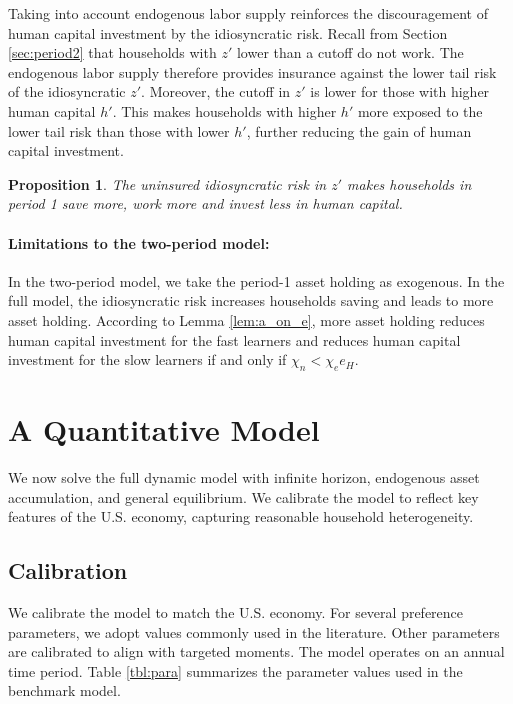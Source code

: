 \documentclass[12pt]{article}
\newtheorem{proposition}{Proposition}
\begin{document}
Taking into account endogenous labor supply reinforces the discouragement of human capital investment by the idiosyncratic risk. Recall from Section \ref{sec:period2} that households with $z'$ lower than a cutoff do not work. The endogenous labor supply therefore provides insurance against the lower tail risk of the idiosyncratic $z'$. Moreover, the cutoff in $z'$ is lower for those with higher human capital $h'$. This makes households with higher $h'$ more exposed to the lower tail risk than those with lower $h'$, further reducing the gain of human capital investment.


\begin{proposition}
    The uninsured idiosyncratic risk in $z'$ makes households in period 1 save more, work more and invest less in human capital.
\end{proposition}

\paragraph{Limitations to the two-period model:} In the two-period model, we take the period-1 asset holding as exogenous. In the full model, the idiosyncratic risk increases households saving and leads to more asset holding. According to Lemma \ref{lem:a_on_e}, more asset holding reduces human capital investment for the fast learners and reduces human capital investment for the slow learners if and only if $\chi_n<\chi_e e_H$.


\section{A Quantitative Model \protect\label{sec:quant_model}}

We now solve the full dynamic model with infinite horizon, endogenous asset accumulation, and general equilibrium. 
We calibrate the model to reflect key features of the U.S. economy,
capturing reasonable household heterogeneity. 

\subsection{Calibration \protect\label{sec:calib}}

We calibrate the model to match the U.S. economy. For several preference
parameters, we adopt values commonly used in the literature. Other
parameters are calibrated to align with targeted moments. The model
operates on an annual time period. Table \ref{tbl:para} summarizes
the parameter values used in the benchmark model.
\end{document}
